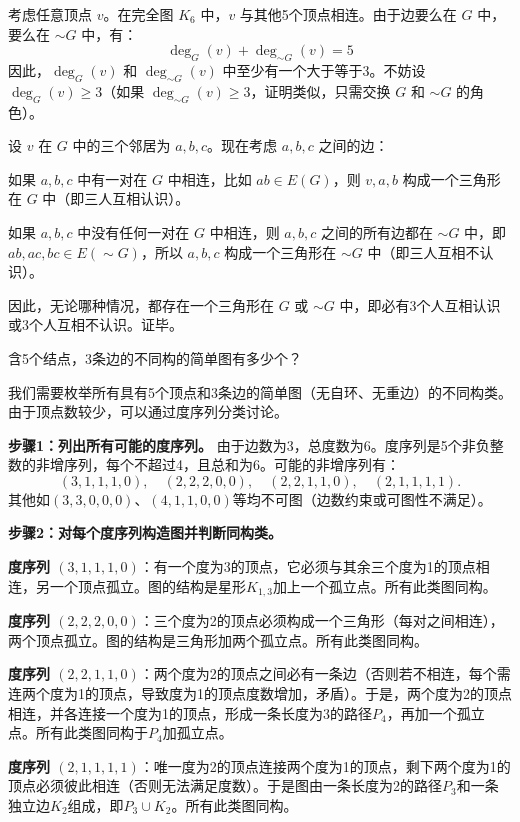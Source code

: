 考虑任意顶点 $v$。在完全图 $K_6$ 中，$v$ 与其他5个顶点相连。由于边要么在 $G$ 中，要么在 $\sim G$ 中，有：
\[\deg_G(v) + \deg_{\sim G}(v) = 5\]
因此，$\deg_G(v)$ 和 $\deg_{\sim G}(v)$ 中至少有一个大于等于3。不妨设 $\deg_G(v) \geqslant 3$（如果 $\deg_{\sim G}(v) \geqslant 3$，证明类似，只需交换 $G$ 和 $\sim G$ 的角色）。

设 $v$ 在 $G$ 中的三个邻居为 $a, b, c$。现在考虑 $a, b, c$ 之间的边：

如果 $a, b, c$ 中有一对在 $G$ 中相连，比如 $ab \in E(G)$，则 $v, a, b$ 构成一个三角形在 $G$ 中（即三人互相认识）。

如果 $a, b, c$ 中没有任何一对在 $G$ 中相连，则 $a, b, c$ 之间的所有边都在 $\sim G$ 中，即 $ab, ac, bc \in E(\sim G)$，所以 $a, b, c$ 构成一个三角形在 $\sim G$ 中（即三人互相不认识）。

因此，无论哪种情况，都存在一个三角形在 $G$ 或 $\sim G$ 中，即必有3个人互相认识或3个人互相不认识。证毕。
\begin{example}{}{}
    含5个结点，3条边的不同构的简单图有多少个？
\end{example}
我们需要枚举所有具有5个顶点和3条边的简单图（无自环、无重边）的不同构类。由于顶点数较少，可以通过度序列分类讨论。

\noindent \textbf{步骤1：列出所有可能的度序列。}
由于边数为3，总度数为6。度序列是5个非负整数的非增序列，每个不超过4，且总和为6。可能的非增序列有：
\[
(3,1,1,1,0),\quad (2,2,2,0,0),\quad (2,2,1,1,0),\quad (2,1,1,1,1).
\]
其他如$(3,3,0,0,0)$、$(4,1,1,0,0)$等均不可图（边数约束或可图性不满足）。

\textbf{步骤2：对每个度序列构造图并判断同构类。}

\textbf{度序列 $(3,1,1,1,0)$}：有一个度为3的顶点，它必须与其余三个度为1的顶点相连，另一个顶点孤立。图的结构是星形$K_{1,3}$加上一个孤立点。所有此类图同构。

\textbf{度序列 $(2,2,2,0,0)$}：三个度为2的顶点必须构成一个三角形（每对之间相连），两个顶点孤立。图的结构是三角形加两个孤立点。所有此类图同构。

\textbf{度序列 $(2,2,1,1,0)$}：两个度为2的顶点之间必有一条边（否则若不相连，每个需连两个度为1的顶点，导致度为1的顶点度数增加，矛盾）。于是，两个度为2的顶点相连，并各连接一个度为1的顶点，形成一条长度为3的路径$P_4$，再加一个孤立点。所有此类图同构于$P_4$加孤立点。

\textbf{度序列 $(2,1,1,1,1)$}：唯一度为2的顶点连接两个度为1的顶点，剩下两个度为1的顶点必须彼此相连（否则无法满足度数）。于是图由一条长度为2的路径$P_3$和一条独立边$K_2$组成，即$P_3 \cup K_2$。所有此类图同构。

